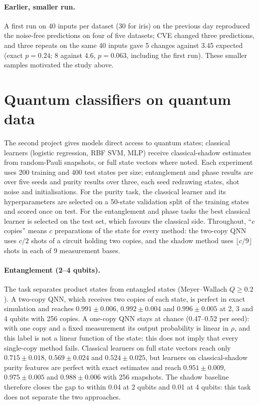 \documentclass[11pt]{article}
\begin{document}
\paragraph{Earlier, smaller run.} A first run on 40 inputs per dataset (30 for iris) on the previous day reproduced the noise-free predictions on four of five datasets; CVE changed three predictions, and three repeats on the same 40 inputs gave 5 changes against 3.45 expected (exact $p = 0.24$; 8 against 4.6, $p = 0.063$, including the first run). These smaller samples motivated the study above.

\section{Quantum classifiers on quantum data}\label{sec:quantum}
The second project gives models direct access to quantum states; classical learners (logistic regression, RBF SVM, MLP) receive classical-shadow estimates~\cite{huang2020shadows} from random-Pauli snapshots, or full state vectors where noted. Each experiment uses 200 training and 400 test states per size; entanglement and phase results are over five seeds and purity results over three, each seed redrawing states, shot noise and initialisations. For the purity task, the classical learner and its hyperparameters are selected on a 50-state validation split of the training states and scored once on test. For the entanglement and phase tasks the best classical learner is selected on the test set, which favours the classical side. Throughout, ``$c$ copies'' means $c$ preparations of the state for every method: the two-copy QNN uses $c/2$ shots of a circuit holding two copies, and the shadow method uses $\lfloor c/9 \rfloor$ shots in each of 9 measurement bases.

\paragraph{Entanglement (2--4 qubits).} The task separates product states from entangled states (Meyer--Wallach $Q \ge 0.2$). A two-copy QNN, which receives two copies of each state, is perfect in exact simulation and reaches $0.991 \pm 0.006$, $0.992 \pm 0.004$ and $0.996 \pm 0.005$ at 2, 3 and 4 qubits with 256 copies. A one-copy QNN stays at chance (0.47--0.52 per seed): with one copy and a fixed measurement its output probability is linear in $\rho$, and this label is not a linear function of the state; this does not imply that every single-copy method fails. Classical learners on full state vectors reach only $0.715 \pm 0.018$, $0.569 \pm 0.024$ and $0.524 \pm 0.025$, but learners on classical-shadow purity features are perfect with exact estimates and reach $0.951 \pm 0.009$, $0.975 \pm 0.005$ and $0.988 \pm 0.006$ with 256 snapshots. The shadow baseline therefore closes the gap to within 0.04 at 2 qubits and 0.01 at 4 qubits: this task does not separate the two approaches.
\end{document}
